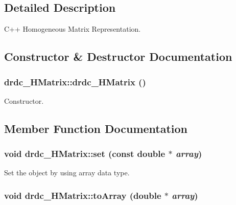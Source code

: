 \subsection{Detailed Description}
C++ Homogeneous Matrix Representation. 



\subsection{Constructor \& Destructor Documentation}
\hypertarget{classdrdc__HMatrix_d9fed0c7347760fbf770c4b06d06da0b}{
\subsubsection[drdc\_\-HMatrix]{\setlength{\rightskip}{0pt plus 5cm}drdc\_\-HMatrix::drdc\_\-HMatrix ()}}
\label{classdrdc__HMatrix_d9fed0c7347760fbf770c4b06d06da0b}


Constructor. 



\subsection{Member Function Documentation}
\hypertarget{classdrdc__HMatrix_ce6e722fa2bb72ffcf049dcca10a3244}{
\subsubsection[set]{\setlength{\rightskip}{0pt plus 5cm}void drdc\_\-HMatrix::set (const double $\ast$ {\em array})}}
\label{classdrdc__HMatrix_ce6e722fa2bb72ffcf049dcca10a3244}


Set the object by using array data type. 

\hypertarget{classdrdc__HMatrix_efc643c73c028a28530cdd1312f2b9ea}{
\subsubsection[toArray]{\setlength{\rightskip}{0pt plus 5cm}void drdc\_\-HMatrix::toArray (double $\ast$ {\em array})}}
\label{classdrdc__HMatrix_efc643c73c028a28530cdd1312f2b9ea}


